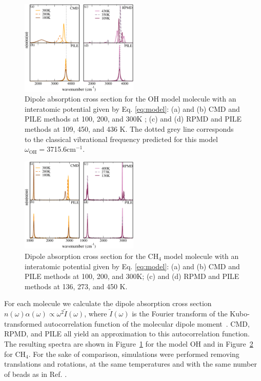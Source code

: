 \documentclass[aps,prb,superscriptaddress,amsmath,amssymb,showpacs,twocolumn]{revtex4}
\begin{document}
\begin{figure}[htbp]
\centering
\includegraphics[width=0.5\textwidth]{figures/comparison_oh_factors.pdf}
\caption{Dipole absorption cross section for the OH model molecule with an interatomic potential given by Eq. \ref{eq:model}: (a) and (b) CMD and PILE methods at 100, 200, and 300K ; (c)  and (d) RPMD and PILE methods at 109, 450, and 436 K. The dotted grey line corresponds to the classical vibrational frequency predicted for this model $\omega_\text{OH}=$3715.6cm$^{-1}$.}
\label{fig:oh-rpmd-cmd-pile}
\end{figure}

\begin{figure}[htbp]
\centering
\includegraphics[width=0.5\textwidth]{figures/comparison_ch4_factors.pdf}
\caption{Dipole absorption cross section for the CH$_4$ model molecule with an interatomic potential given by Eq. \ref{eq:model}: (a) and (b) CMD and PILE methods at 100, 200, and 300K; (c) and (d) RPMD and PILE methods at 136, 273, and 450 K.}
\label{fig:ch4-rpmd-cmd-pile}
\end{figure}

For each molecule we calculate the dipole absorption cross section $n(\omega)\alpha(\omega)\propto \omega^2  \tilde{I}(\omega)$, 
where $\tilde{I}(\omega)$ is the Fourier transform of the Kubo-transformed autocorrelation function of the molecular dipole 
moment~\cite{habe+08jcp}. CMD, RPMD, and PILE all yield an approximation to this autocorrelation function. 
The resulting spectra are shown in Figure~\ref{fig:oh-rpmd-cmd-pile} for the model OH 
and in Figure~\ref{fig:ch4-rpmd-cmd-pile} for CH$_4$. 
For the sake of comparison, simulations were performed removing translations and 
rotations, at the same temperatures and with the same number of beads as in Ref. \cite{witt+09jcp}.
\end{document}
